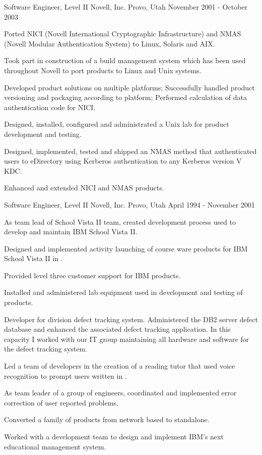 \begin{cventries}
\cventry
{Software Engineer, Level II} %
{Novell, Inc.} %
{Provo, Utah} %
{November 2001 - October 2003} %
{
	\begin{cvitems} %
		\item {Ported NICI (Novell International Cryptographic Infrastructure) and NMAS (Novell Modular Authentication System) to Linux, Solaris and AIX.}
		\item {Took part in construction of a build management system which has been used throughout Novell to port products to Linux and Unix systems.}
		\item {Developed product solutions on multiple platforms; Successfully handled product versioning and packaging according to platform; Performed calculation of data authentication code for NICI.}
		\item {Designed, installed, configured and administrated a Unix lab for product development and testing.}
		\item {Designed, implemented, tested and shipped an NMAS method that authenticated users to eDirectory using Kerberos authentication to any Kerberos version V KDC.}
		\item {Enhanced and extended NICI and NMAS products.}
	\end{cvitems}
}

\cventry
{Software Engineer, Level II} %
{Novell, Inc.} %
{Provo, Utah} %
{April 1994 - November 2001} %
{
	\begin{cvitems} %
		\item {As team lead of School Vista II team, created development process used to develop and maintain IBM School Vista II.}
		\item {Designed and implemented activity launching of course ware products for IBM School Vista II in \Cpp{}.}
		\item {Provided level three customer support for IBM products.}
		\item {Installed and administered lab equipment used in development and testing of products.}
		\item {Developer for division defect tracking system. Administered the DB2 server defect database and enhanced the associated defect tracking application. In this capacity I worked with our IT group maintaining all hardware and software for the defect tracking system.}
		\item {Led a team of developers in the creation of a reading tutor that used voice recognition to prompt users written in \Cpp{}.}
		\item {As team leader of a group of engineers, coordinated and implemented error correction of user reported problems.}
		\item {Converted a family of products from network based to standalone.}
		\item {Worked with a development team to design and implement IBM's next educational management system.}
	\end{cvitems}
}
\end{cventries}